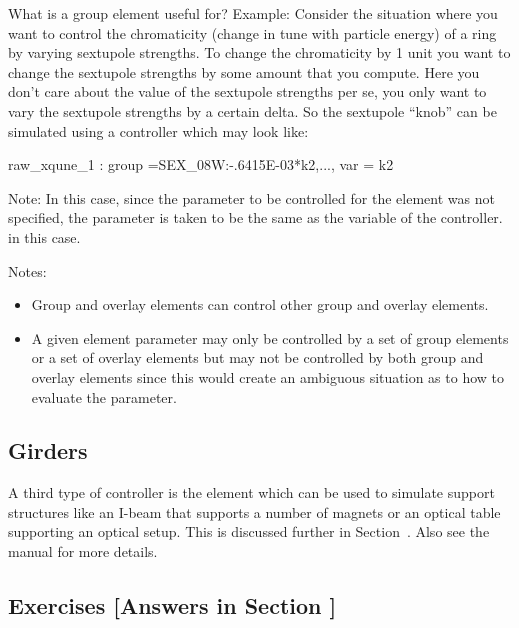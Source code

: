 \documentclass{hitec}     %
\begin{document}
{What is a group element useful for? Example: Consider the situation where you want to control the
chromaticity (change in tune with particle energy) of a ring by varying sextupole strengths. To
change the chromaticity by 1 unit you want to change the sextupole strengths by some amount that you
compute. Here you don't care about the value of the sextupole strengths per se, you only want to vary the
sextupole strengths by a certain delta. So the sextupole ``knob'' can be simulated using a 
controller which may look like:
\begin{code} 
raw_xqune_1 : group ={SEX_08W:-.6415E-03*k2,...}, var = {k2}
\end{code}
Note: In this case, since the parameter to be controlled for the  element was not specified,
the parameter is taken to be the same as the variable of the controller.  in this case.

Notes:
\vspace{-5 pt}
\begin{itemize}
\item
Group and overlay elements can control other group and overlay elements.
\item
A given element parameter may only be controlled by a set of group elements or a set of overlay
elements but may not be controlled by both group and overlay elements since this would create
an ambiguous situation as to how to evaluate the parameter.
\end{itemize}

\subsection{Girders}
\label{s:girder}

A third type of controller is the  element which can be used to simulate support
structures like an I-beam that supports a number of magnets or an optical table supporting an
optical setup. This is discussed further in Section~. Also see the \bmad manual for
more details.

\subsection{Exercises [Answers in Section ]}
\label{s:control.ex}

}
\end{document}
